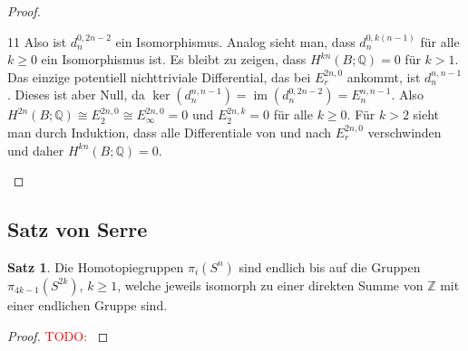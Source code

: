 \documentclass[11pt, a4paper, german]{article}
\theoremstyle{definition}
\newtheorem*{satz}{Satz}
\theoremstyle{remark}
\newcommand{\TODO}[1]{\textcolor{red}{TODO: #1}} %
\newcommand{\Z}{\mathbb{Z}} %
\newcommand{\Q}{\mathbb{Q}} %
\DeclareMathOperator{\im}{im} %
\begin{document}
\begin{proof}
\begin{cutout}{0}{0pt}{\dimexpr\linewidth-5.5cm\relax}{11}
    Also ist $d_n^{0,2n-2}$ ein Isomorphismus.
    Analog sieht man, dass $d_n^{0,k(n-1)}$ für alle $k \geq 0$ ein Isomorphismus ist.
    Es bleibt zu zeigen, dass $H^{kn}(B; \Q) = 0$ für $k > 1$.
    Das einzige potentiell nichttriviale Differential, das bei $E_r^{2n,0}$ ankommt, ist $d_n^{n,n-1}$.
    Dieses ist aber Null, da $\ker(d_n^{n,n-1}) = \im(d_n^{0,2n-2}) = E_n^{n,n-1}$.
    Also $H^{2n}(B; \Q) \cong E_2^{2n,0} \cong E_\infty^{2n,0} = 0$ und $E_2^{2n,k} = 0$ für alle $k \geq 0$.
    Für $k > 2$ sieht man durch Induktion, dass alle Differentiale von und nach $E_r^{2n,0}$ verschwinden und daher $H^{kn}(B; \Q) = 0$.
  \end{cutout}
\end{proof}

\subsection{Satz von Serre}

\begin{satz}
  Die Homotopiegruppen $\pi_i(S^n)$ sind endlich bis auf die Gruppen $\pi_{4k-1}(S^{2k})$, $k \geq 1$, welche jeweils isomorph zu einer direkten Summe von $\Z$ mit einer endlichen Gruppe sind.
\end{satz}

\begin{proof}
  \TODO{}
\end{proof}


\end{document}
